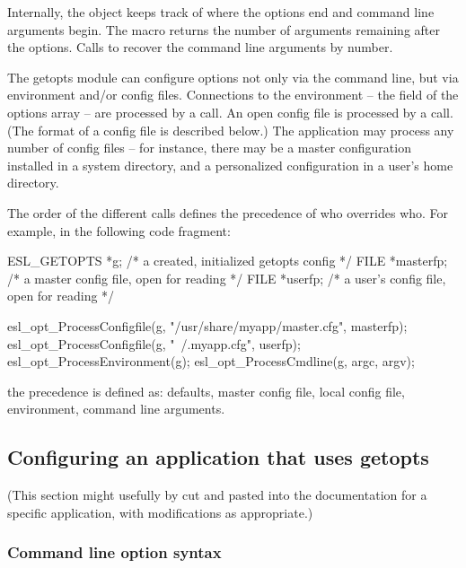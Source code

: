 Internally, the object keeps track of where the options end and
command line arguments begin. The macro 
returns the number of arguments remaining after the options.  Calls to
 recover the command line arguments by
number.

The getopts module can configure options not only via the command
line, but via environment and/or config files.  Connections to the
environment -- the  field of the options array -- are
processed by a  call.  An open
config file is processed by a 
call. (The format of a config file is described below.) The
application may process any number of config files -- for instance,
there may be a master configuration installed in a system directory,
and a personalized configuration in a user's home directory.

The order of the different  calls defines the
precedence of who overrides who. For example, in the following code
fragment:

\begin{cchunk}
   ESL_GETOPTS *g;        /* a created, initialized getopts config  */
   FILE *masterfp;        /* a master config file, open for reading */
   FILE *userfp;          /* a user's config file, open for reading */

   esl_opt_ProcessConfigfile(g, "/usr/share/myapp/master.cfg", masterfp);
   esl_opt_ProcessConfigfile(g, "~/.myapp.cfg",                userfp);
   esl_opt_ProcessEnvironment(g);
   esl_opt_ProcessCmdline(g, argc, argv);
\end{cchunk}

the precedence is defined as: defaults, master config file, local
config file, environment, command line arguments. 


\subsection{Configuring an application that uses getopts}

(This section might usefully by cut and pasted into the documentation
for a specific application, with modifications as appropriate.)

   \subsubsection{Command line option syntax}

